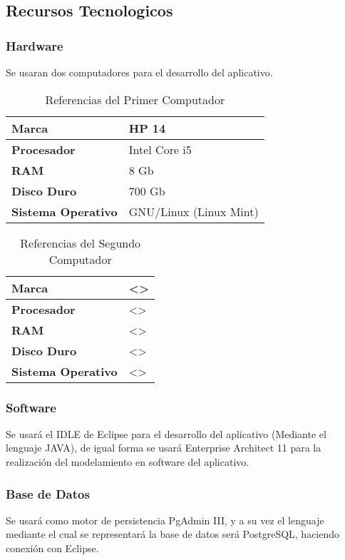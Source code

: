 \subsection{Recursos Tecnologicos}
\subsubsection*{Hardware}
Se usaran dos computadores para el desarrollo del aplicativo. \\
\begin{table}[h!]
	\begin{center}
		\begin{tabular}{|p{7cm} |p{7cm}|} 
			\hline \textbf{Marca} &  HP 14\\
			\hline \textbf{Procesador} &  Intel Core i5\\
			\hline \textbf{RAM} &  8 Gb\\
			\hline \textbf{Disco Duro} &  700 Gb\\
			\hline \textbf{Sistema Operativo} &  GNU/Linux (Linux Mint)\\
			\hline
		\end{tabular}
		\caption{Referencias del Primer Computador}
		\label{equipoU}
	\end{center}
\end{table}

\begin{table}[h!]
	\begin{center}
		\begin{tabular}{|p{7cm} |p{7cm}|} 
			\hline \textbf{Marca} &  <> \\
			\hline \textbf{Procesador} &  <>\\
			\hline \textbf{RAM} &  <>\\
			\hline \textbf{Disco Duro} &  <>\\
			\hline \textbf{Sistema Operativo} &  <>\\
			\hline
		\end{tabular}
		\caption{Referencias del Segundo Computador}
		\label{equipoD}
	\end{center}
\end{table}
\subsubsection*{Software}
Se usar\'a el IDLE de Eclipse para el desarrollo del aplicativo (Mediante el lenguaje JAVA), de igual forma se usará Enterprise Architect 11 para la realizaci\'on del modelamiento en software del aplicativo.
\subsubsection*{Base de Datos}
Se usar\'a como motor de persistencia PgAdmin III, y a su vez el lenguaje mediante el cual se representar\'a la base de datos ser\'a PostgreSQL, haciendo conexi\'on con Eclipse.

